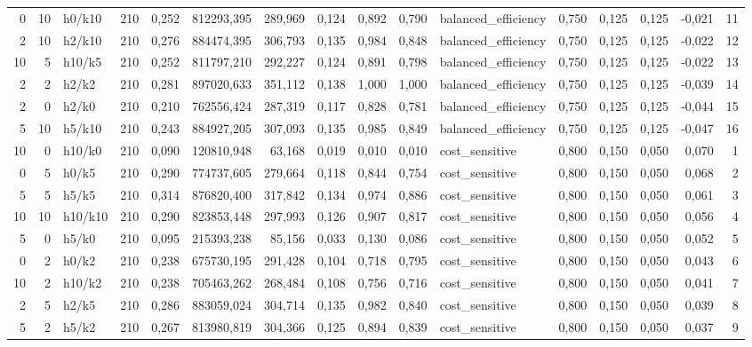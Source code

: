\begin{longtable}{rrlrrrrrrrlrrrrr}
0 & 10 & h0/k10 & 210 & 0,252 & 812293,395 & 289,969 & 0,124 & 0,892 & 0,790 & balanced\_efficiency & 0,750 & 0,125 & 0,125 & -0,021 & 11 \\
2 & 10 & h2/k10 & 210 & 0,276 & 884474,395 & 306,793 & 0,135 & 0,984 & 0,848 & balanced\_efficiency & 0,750 & 0,125 & 0,125 & -0,022 & 12 \\
10 & 5 & h10/k5 & 210 & 0,252 & 811797,210 & 292,227 & 0,124 & 0,891 & 0,798 & balanced\_efficiency & 0,750 & 0,125 & 0,125 & -0,022 & 13 \\
2 & 2 & h2/k2 & 210 & 0,281 & 897020,633 & 351,112 & 0,138 & 1,000 & 1,000 & balanced\_efficiency & 0,750 & 0,125 & 0,125 & -0,039 & 14 \\
2 & 0 & h2/k0 & 210 & 0,210 & 762556,424 & 287,319 & 0,117 & 0,828 & 0,781 & balanced\_efficiency & 0,750 & 0,125 & 0,125 & -0,044 & 15 \\
5 & 10 & h5/k10 & 210 & 0,243 & 884927,205 & 307,093 & 0,135 & 0,985 & 0,849 & balanced\_efficiency & 0,750 & 0,125 & 0,125 & -0,047 & 16 \\
10 & 0 & h10/k0 & 210 & 0,090 & 120810,948 & 63,168 & 0,019 & 0,010 & 0,010 & cost\_sensitive & 0,800 & 0,150 & 0,050 & 0,070 & 1 \\
0 & 5 & h0/k5 & 210 & 0,290 & 774737,605 & 279,664 & 0,118 & 0,844 & 0,754 & cost\_sensitive & 0,800 & 0,150 & 0,050 & 0,068 & 2 \\
5 & 5 & h5/k5 & 210 & 0,314 & 876820,400 & 317,842 & 0,134 & 0,974 & 0,886 & cost\_sensitive & 0,800 & 0,150 & 0,050 & 0,061 & 3 \\
10 & 10 & h10/k10 & 210 & 0,290 & 823853,448 & 297,993 & 0,126 & 0,907 & 0,817 & cost\_sensitive & 0,800 & 0,150 & 0,050 & 0,056 & 4 \\
5 & 0 & h5/k0 & 210 & 0,095 & 215393,238 & 85,156 & 0,033 & 0,130 & 0,086 & cost\_sensitive & 0,800 & 0,150 & 0,050 & 0,052 & 5 \\
0 & 2 & h0/k2 & 210 & 0,238 & 675730,195 & 291,428 & 0,104 & 0,718 & 0,795 & cost\_sensitive & 0,800 & 0,150 & 0,050 & 0,043 & 6 \\
10 & 2 & h10/k2 & 210 & 0,238 & 705463,262 & 268,484 & 0,108 & 0,756 & 0,716 & cost\_sensitive & 0,800 & 0,150 & 0,050 & 0,041 & 7 \\
2 & 5 & h2/k5 & 210 & 0,286 & 883059,024 & 304,714 & 0,135 & 0,982 & 0,840 & cost\_sensitive & 0,800 & 0,150 & 0,050 & 0,039 & 8 \\
5 & 2 & h5/k2 & 210 & 0,267 & 813980,819 & 304,366 & 0,125 & 0,894 & 0,839 & cost\_sensitive & 0,800 & 0,150 & 0,050 & 0,037 & 9 \\

\end{longtable}
